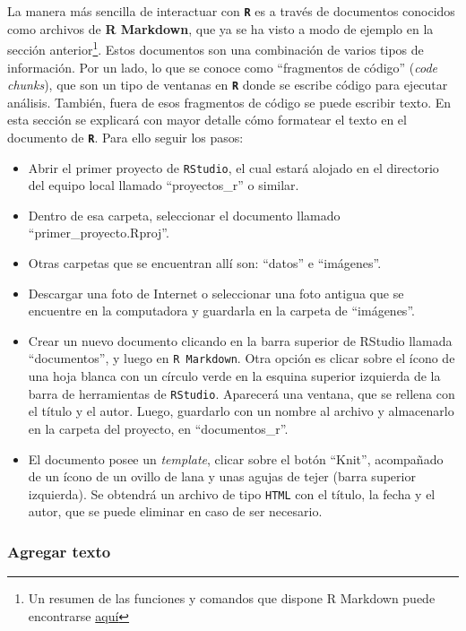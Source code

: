 \documentclass[
]{article}
\begin{document}
La manera más sencilla de interactuar con \textbf{\texttt{R}} es a través de documentos conocidos como archivos de \textbf{R Markdown}, que ya se ha visto a modo de ejemplo en la sección anterior\footnote{Un resumen de las funciones y comandos que dispone R Markdown puede encontrarse \href{https://www.rstudio.com/wp-content/uploads/2015/02/rmarkdown-cheatsheet.pdf}{aquí}}. Estos documentos son una combinación de varios tipos de información. Por un lado, lo que se conoce como ``fragmentos de código'' (\emph{code chunks}), que son un tipo de ventanas en \textbf{\texttt{R}} donde se escribe código para ejecutar análisis. También, fuera de esos fragmentos de código se puede escribir texto. En esta sección se explicará con mayor detalle cómo formatear el texto en el documento de \textbf{\texttt{R}}. Para ello seguir los pasos:

\begin{itemize}
\item
  Abrir el primer proyecto de \texttt{RStudio}, el cual estará alojado en el directorio del equipo local llamado ``proyectos\_r'' o similar.
\item
  Dentro de esa carpeta, seleccionar el documento llamado ``primer\_proyecto.Rproj''.
\item
  Otras carpetas que se encuentran allí son: ``datos'' e ``imágenes''.
\item
  Descargar una foto de Internet o seleccionar una foto antigua que se encuentre en la computadora y
  guardarla en la carpeta de ``imágenes''.
\item
  Crear un nuevo documento clicando en la barra superior de RStudio llamada ``documentos'', y luego en \texttt{R\ Markdown}. Otra opción es clicar sobre el ícono de una hoja blanca con un círculo verde en la esquina superior izquierda de la barra de herramientas de \texttt{RStudio}. Aparecerá una ventana, que se rellena con el título y el autor. Luego, guardarlo con un nombre al archivo y almacenarlo en la carpeta del proyecto, en ``documentos\_r''.
\item
  El documento posee un \emph{template}, clicar sobre el botón ``Knit'', acompañado de un ícono de un ovillo de lana y unas agujas de tejer (barra superior izquierda). Se obtendrá un archivo de tipo \texttt{HTML} con el título, la fecha y el autor, que se puede eliminar en caso de ser necesario.
\end{itemize}

\hypertarget{agregar-texto}{%
\subsubsection{Agregar texto}\label{agregar-texto}}
\end{document}
